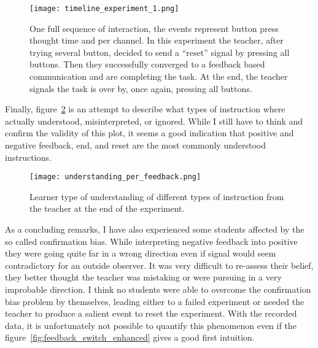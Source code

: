 \begin{figure}[H]
	\begin{center}
   		\texttt{[image: timeline\_experiment\_1.png]}
   		\caption{One full sequence of interaction, the events represent button press thought time and per channel. In this experiment the teacher, after trying several button, decided to send a ``reset'' signal by pressing all buttons. Then they successfully converged to a feedback based communication and are completing the task. At the end, the teacher signals the task is over by, once again, pressing all buttons.}
    \label{fig:timeline}
   	\end{center}
\end{figure}

Finally, figure~\ref{fig:understanding_per_feedback} is an attempt to describe what types of instruction where actually understood, misinterpreted, or ignored. While I still have to think and confirm the validity of this plot, it seems a good indication that positive and negative feedback, end, and reset are the most commonly understood instructions. 

\begin{figure}[H]
	\begin{center}
   		\texttt{[image: understanding\_per\_feedback.png]}
   		\caption{Learner type of understanding of different types of instruction from the teacher at the end of the experiment.}
    \label{fig:understanding_per_feedback}
   	\end{center}
\end{figure}

As a concluding remarks, I have also experienced some students affected by the so called confirmation bias. While interpreting negative feedback into positive they were going quite far in a wrong direction even if signal would seem contradictory for an outside observer. It was very difficult to re-assess their belief, they better thought the teacher was mistaking or were pursuing in a very improbable direction. I think no students were able to overcome the confirmation bias problem by themselves, leading either to a failed experiment or needed the teacher to produce a salient event to reset the experiment. With the recorded data, it is unfortunately not possible to quantify this phenomenon even if the figure~\ref{fig:feedback_switch_enhanced} gives a good first intuition.
